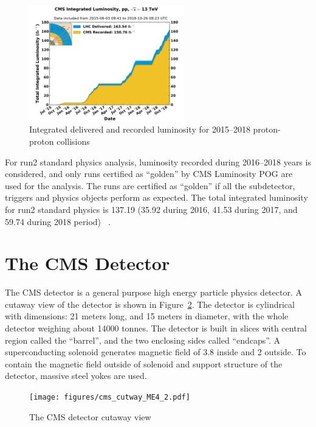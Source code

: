 \begin{figure}[!ht]
  \centering
  \includegraphics[width=0.60\textwidth]{figures/int_lumi_pp_run2.pdf}
  \caption[Integrated delivered and recorded luminosity
    for 2015--2018 proton-proton collisions]%
  {Integrated delivered and recorded luminosity
    for  2015--2018 proton-proton collisions~\cite{plot-cms-lumi}}%
  \label{fig:int-lumi}
\end{figure}

For run2 standard physics analysis, luminosity recorded during
2016--2018 years is considered, and only runs certified as ``golden'' by \gls{CMS}
Luminosity \gls{POG} are used for the analysis. The runs
are certified as ``golden'' if all the subdetector, triggers and
physics objects perform as expected. The total
integrated luminosity for run2
standard physics is 137.19\fbinv{} (35.92\fbinv{} during 2016, 41.53\fbinv{}
during 2017, and 59.74\fbinv{} during 2018 period)
~\cite{CMS-PAS-LUM-17-001,CMS-PAS-LUM-17-004,CMS-PAS-LUM-18-002}.

\section{
  The CMS Detector
 }\label{ch_cms:cms}

The \gls{CMS} detector is a general purpose high energy particle physics detector.
A cutaway view of the detector is shown in Figure~\ref{fig:cms-cutaway}.
The detector is cylindrical with dimensions: 21 meters long, and 15 meters
in diameter, with the whole detector weighing about 14000 tonnes.
The detector is built in slices with central region called the ``barrel'',
and the two enclosing sides called ``endcaps''.
A superconducting solenoid generates magnetic field of 3.8\Tesla{} inside
and 2\Tesla{} outside. To contain the magnetic field outside of solenoid
and support structure of the detector, massive steel yokes are used.

\begin{figure}[!ht]
  \centering
  \texttt{[image: figures/cms\_cutway\_ME4\_2.pdf]}
  \caption[The CMS detector cutaway view]%
  {The CMS detector cutaway view~\cite{image-cms-cutway}}%
  \label{fig:cms-cutaway}
\end{figure}

